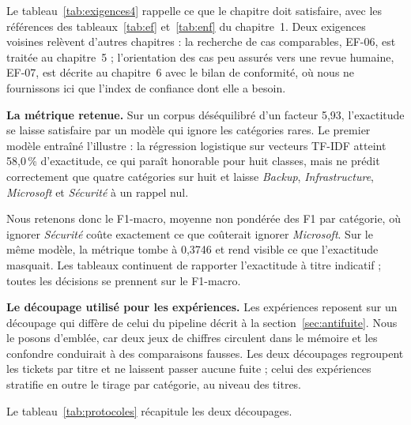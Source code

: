 Le tableau~\ref{tab:exigences4} rappelle ce que le chapitre doit satisfaire, avec les références
des tableaux~\ref{tab:ef} et~\ref{tab:enf} du chapitre~1. Deux exigences voisines relèvent d'autres
chapitres : la recherche de cas comparables, EF-06, est traitée au chapitre~5 ; l'orientation
des cas peu assurés vers une revue humaine, EF-07, est décrite au chapitre~6 avec le bilan de
conformité, où nous ne fournissons ici que l'index de confiance dont elle a besoin.

\textbf{La métrique retenue.} Sur un corpus déséquilibré d'un facteur 5,93, l'exactitude se laisse satisfaire par un modèle qui
ignore les catégories rares. Le premier modèle entraîné l'illustre : la régression logistique sur
vecteurs TF-IDF atteint 58,0\,\% d'exactitude, ce qui paraît honorable pour huit classes, mais ne
prédit correctement que quatre catégories sur huit et laisse \emph{Backup},
\emph{Infrastructure}, \emph{Microsoft} et \emph{Sécurité} à un rappel nul.

Nous retenons donc le F1-macro, moyenne non pondérée des F1 par catégorie, où ignorer
\emph{Sécurité} coûte exactement ce que coûterait ignorer \emph{Microsoft}. Sur le même modèle, la
métrique tombe à 0,3746 et rend visible ce que l'exactitude masquait. Les tableaux continuent de
rapporter l'exactitude à titre indicatif ; toutes les décisions se prennent sur le F1-macro.

\label{sec:protocole}

\textbf{Le découpage utilisé pour les expériences.} Les expériences reposent sur un découpage qui diffère de celui du pipeline décrit à la
section~\ref{sec:antifuite}. Nous le posons d'emblée, car deux jeux de chiffres circulent dans le
mémoire et les confondre conduirait à des comparaisons fausses. Les deux découpages regroupent les
tickets par titre et ne laissent passer aucune fuite ; celui des expériences stratifie en outre le
tirage par catégorie, au niveau des titres.

Le tableau~\ref{tab:protocoles} récapitule les deux découpages.

